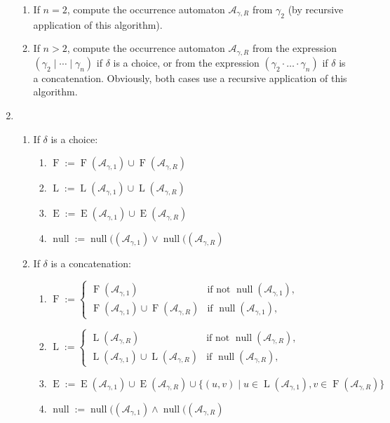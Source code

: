 \documentclass[a4paper,11pt, svgnames,titlepage]{article}
\newcommand{\rxc}{\cdot}
\DeclareMathOperator{\ror}{\mathtt{|}}
\newcommand{\df}{:=}
\DeclareMathOperator{\first}{F}
\DeclareMathOperator{\last}{L}
\DeclareMathOperator{\follow}{E}
\DeclareMathOperator{\nullable}{null}
\begin{document}
\begin{enumerate}
\begin{enumerate}[label*=\arabic*.]
		\item If $n=2$, compute the occurrence automaton $\mathcal{A}_{\gamma,R}$ from $\gamma_2$ (by recursive application of this algorithm).
		\item If $n>2$, compute the occurrence automaton $\mathcal{A}_{\gamma,R}$ from the expression $(\gamma_2\ror\cdots\ror\gamma_n)$ if $\delta$ is a choice, or from the expression $(\gamma_2\rxc\ldots\rxc\gamma_n)$ if $\delta$ is a concatenation. Obviously, both cases use a recursive application of this algorithm.
	\end{enumerate}
	\item
	\begin{enumerate}[label*=\arabic*.]	
	\item If $\delta$ is a choice:
	\begin{enumerate}[label*=\arabic*.]
		\item $\first\df \first(\mathcal{A}_{\gamma,1})\cup\first(\mathcal{A}_{\gamma,R})$
		\item $\last\df \last(\mathcal{A}_{\gamma,1})\cup\last(\mathcal{A}_{\gamma,R})$
		\item $\follow\df \follow(\mathcal{A}_{\gamma,1})\cup\follow(\mathcal{A}_{\gamma,R})$
		\item $\nullable \df \nullable((\mathcal{A}_{\gamma,1})\vee\nullable((\mathcal{A}_{\gamma,R})$
	\end{enumerate}
	\item If $\delta$ is a concatenation:
	\begin{enumerate}[label*=\arabic*.]
		\item $\first\df \begin{cases}
			\first(\mathcal{A}_{\gamma,1}) & \text{if not }\nullable(\mathcal{A}_{\gamma,1}),\\
			\first(\mathcal{A}_{\gamma,1})\cup\first(\mathcal{A}_{\gamma,R}) & \text{if }\nullable(\mathcal{A}_{\gamma,1}),
		\end{cases}$
		\item $\last\df \begin{cases}
			\last(\mathcal{A}_{\gamma,R}) & \text{if not }\nullable(\mathcal{A}_{\gamma,R}),\\
			\last(\mathcal{A}_{\gamma,1})\cup\last(\mathcal{A}_{\gamma,R}) & \text{if }\nullable(\mathcal{A}_{\gamma,R}),
		\end{cases}$
		\item 
			$\follow\df \follow(\mathcal{A}_{\gamma,1})\cup\follow(\mathcal{A}_{\gamma,R})
			\cup\{(u,v)\mid u\in\last(\mathcal{A}_{\gamma,1}), v\in\first(\mathcal{A}_{\gamma,R})\}$
		\item $\nullable \df \nullable((\mathcal{A}_{\gamma,1})\wedge\nullable((\mathcal{A}_{\gamma,R})$
	\end{enumerate}
\end{enumerate}
\end{enumerate}
\end{document}
